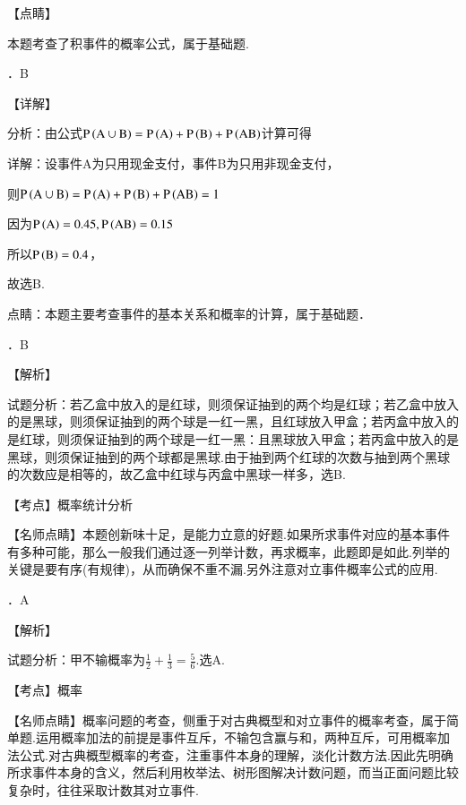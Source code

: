 \documentclass[a4paper,11pt,UTF8,twoside]{ctexart} %
\begin{document}
\noindent 【点睛】

\noindent 本题考查了积事件的概率公式，属于基础题.

．B

\noindent 【详解】

\noindent 分析：由公式${\rm P}\left({\rm A}\cup {\rm B}\right)={\rm P}\left({\rm A}\right)+{\rm P}\left({\rm B}\right)+{\rm P}\left({\rm AB}\right)$计算可得

\noindent 详解：设事件A为只用现金支付，事件B为只用非现金支付，

\noindent 则${\rm P}\left({\rm A}\cup {\rm B}\right)={\rm P}\left({\rm A}\right)+{\rm P}\left({\rm B}\right)+{\rm P}\left({\rm AB}\right)=1$

\noindent 因为${\rm P}\left({\rm A}\right)=0.45,{\rm P}\left({\rm AB}\right)=0.15$

\noindent 所以${\rm P}\left({\rm B}\right)=0.4$，

\noindent 故选B.

\noindent 点睛：本题主要考查事件的基本关系和概率的计算，属于基础题．

．B

\noindent 【解析】

\noindent 试题分析：若乙盒中放入的是红球，则须保证抽到的两个均是红球；若乙盒中放入的是黑球，则须保证抽到的两个球是一红一黑，且红球放入甲盒；若丙盒中放入的是红球，则须保证抽到的两个球是一红一黑：且黑球放入甲盒；若丙盒中放入的是黑球，则须保证抽到的两个球都是黑球.由于抽到两个红球的次数与抽到两个黑球的次数应是相等的，故乙盒中红球与丙盒中黑球一样多，选B.

\noindent 【考点】概率统计分析

\noindent 【名师点睛】本题创新味十足，是能力立意的好题.如果所求事件对应的基本事件有多种可能，那么一般我们通过逐一列举计数，再求概率，此题即是如此.列举的关键是要有序(有规律)，从而确保不重不漏.另外注意对立事件概率公式的应用.

\noindent 

．A

\noindent 【解析】

\noindent 试题分析：甲不输概率为$\frac{1}{2}+\frac{1}{3}=\frac{5}{6}.$选A.

\noindent 【考点】概率

\noindent 【名师点睛】概率问题的考查，侧重于对古典概型和对立事件的概率考查，属于简单题.运用概率加法的前提是事件互斥，不输包含赢与和，两种互斥，可用概率加法公式.对古典概型概率的考查，注重事件本身的理解，淡化计数方法.因此先明确所求事件本身的含义，然后利用枚举法、树形图解决计数问题，而当正面问题比较复杂时，往往采取计数其对立事件.
\end{document}
